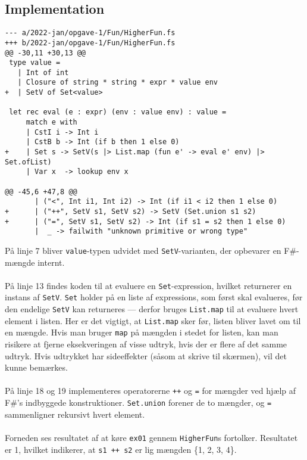 \subsection{Implementation}

\begin{verbatim}
--- a/2022-jan/opgave-1/Fun/HigherFun.fs
+++ b/2022-jan/opgave-1/Fun/HigherFun.fs
@@ -30,11 +30,13 @@
 type value = 
   | Int of int
   | Closure of string * string * expr * value env
+  | SetV of Set<value>
 
 let rec eval (e : expr) (env : value env) : value =
     match e with
     | CstI i -> Int i
     | CstB b -> Int (if b then 1 else 0)
+    | Set s -> SetV(s |> List.map (fun e' -> eval e' env) |> Set.ofList)
     | Var x  -> lookup env x

@@ -45,6 +47,8 @@
       | ("<", Int i1, Int i2) -> Int (if i1 < i2 then 1 else 0)
+      | ("++", SetV s1, SetV s2) -> SetV (Set.union s1 s2)
+      | ("=", SetV s1, SetV s2) -> Int (if s1 = s2 then 1 else 0)
       |  _ -> failwith "unknown primitive or wrong type"
\end{verbatim}

På linje 7 bliver \texttt{value}-typen udvidet med \texttt{SetV}-varianten, der opbevarer en F\#-mængde internt.
\\\\
På linje 13 findes koden til at evaluere en \texttt{Set}-expression, hvilket returnerer en instans af \texttt{SetV}. \texttt{Set} holder på en liste af expressions, som først skal evalueres, før den endelige \texttt{SetV} kan returneres --- derfor bruges \texttt{List.map} til at evaluere hvert element i listen. Her er det vigtigt, at \texttt{List.map} sker før, listen bliver lavet om til en mængde. Hvis man bruger \texttt{map} på mængden i stedet for listen, kan man risikere at fjerne eksekveringen af visse udtryk, hvis der er flere af det samme udtryk. Hvis udtrykket har sideeffekter (såsom at skrive til skærmen), vil det kunne bemærkes.
\\\\
På linje 18 og 19 implementeres operatorerne \texttt{++} og \texttt{=} for mængder ved hjælp af F\#'s indbyggede konstruktioner. \texttt{Set.union} forener de to mængder, og \texttt{=} sammenligner rekursivt hvert element.
\\\\
Forneden ses resultatet af at køre \texttt{ex01} gennem \texttt{HigherFun}s fortolker. Resultatet er 1, hvilket indikerer, at \texttt{s1 ++ s2} er lig mængden \{1, 2, 3, 4\}.

